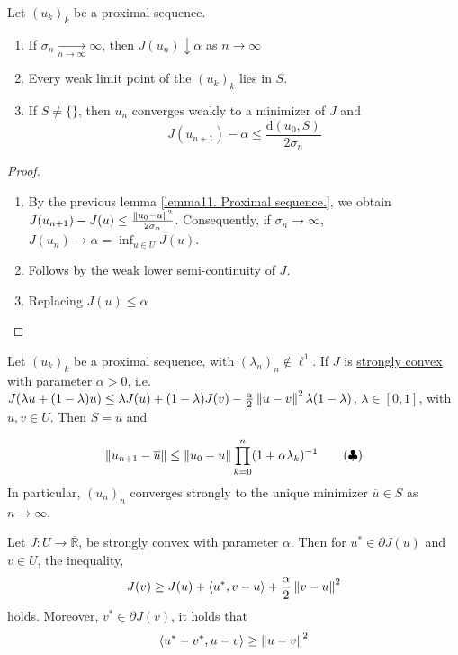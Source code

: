 \begin{theorem}
	Let $(u_k)_k$ be a proximal sequence.
	
	\begin{enumerate}
		\item If $\sigma_n \xrightarrow[n\rightarrow\infty]{}\infty$, then $J(u_n) \downarrow \alpha$ as $n\rightarrow \infty$
		\item Every weak limit point of the $(u_k)_k$ lies in $S$.
		\item  If $S\neq\{\}$, then $u_n$ converges weakly to a minimizer of $J$ and 
		\[
			J(u_{n+1}) - \alpha \leq \frac{\mathrm{d}(u_0, S)}{2 \sigma_n}
		\]
	\end{enumerate}
	\begin{proof} \
		\begin{enumerate}

		\item 		By the previous lemma \eqref{lemma11. Proximal sequence.}, we obtain $J(u_{n+1})-J(u) \leq \frac{\left\lVert u_0-u\right\rVert^2}{2\sigma_n}$. Consequently, if $\sigma_n \rightarrow \infty$, $J(u_n)\rightarrow \alpha = \inf_{u\in U } J(u)$.
		\item Follows by the weak lower semi-continuity of $J$.
		\item Replacing $J(u)\leq \alpha$
		\end{enumerate}
	\end{proof}
\end{theorem}

\begin{theorem}
	Let $(u_k)_k$ be a proximal sequence, with $(\lambda_n)_n \notin \ell^1$. If $J$ is \underline{strongly convex} with parameter $\alpha > 0$, i.e. $J(\lambda u + (1-\lambda)u) \leq \lambda J(u)+ (1-\lambda) J(v) -\frac{\alpha}{2} \left\lVert u-v\right\rVert^2\lambda (1-\lambda)$, $\lambda \in [0,1]$, with $u,v \in U$. Then $S={\overline{u}}$ and 
	
	\begin{equation}
		\label{eq11. Ineq Prod.}\left\lVert u_{n+1}-\overline{u}\right\rVert \leq \left\lVert u_0-u\right\rVert \prod_{k=0}^{n} (1+\alpha \lambda_k)^{-1} \tag{$\clubsuit$}
	\end{equation}
	In particular, $(u_n)_n$ converges strongly to the unique minimizer $\overline{u} \in S$ as $n\rightarrow \infty$.
\end{theorem}

\begin{lemma}
	Let $J:U\rightarrow \overline{\mathbb{R}}$, be strongly convex with parameter $\alpha$. Then for $u^* \in \partial J(u)$ and $v\in U$, the inequality,
	\begin{align}
		J(v)\geq J(u)+\langle u^*, v-u\rangle +\frac{\alpha}{2}\left\lVert v-u\right\rVert^2
	\end{align}
	holds. Moreover, $v^* \in \partial J(v)$, it holds that 
	\begin{equation}
		\langle u^*-v^*, u-v\rangle \geq \left\lVert u-v\right\rVert^2
	\end{equation}
\end{lemma}

